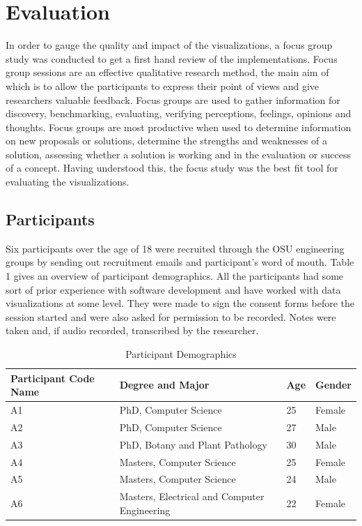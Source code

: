\documentclass[seploa]{beavtex}
\begin{document}
\chapter{Evaluation}
In order to gauge the quality and impact of the visualizations, a focus group study was conducted to get a first hand review of the implementations. Focus group sessions are an effective qualitative research method, the main aim of which is to allow the participants to express their point of views and give researchers valuable feedback\cite{villard}.  Focus groups are used to gather information for discovery, benchmarking, evaluating, verifying perceptions, feelings, opinions and thoughts\cite{patton1990}. Focus groups are most productive when used to determine information on new proposals or solutions, determine the strengths and weaknesses of a solution, assessing whether a solution is working and in the evaluation or success of a concept\cite{greenbaum1993}. Having understood this, the focus study was the best fit tool for evaluating the visualizations.

\section{Participants}
Six participants over the age of 18 were recruited through the OSU engineering groups by sending out recruitment emails and participant's word of mouth. Table 1 gives an overview of participant demographics. All the participants had some sort of prior experience with software development and have worked with data visualizations at some level. They were made to sign the consent forms before the session started and were also asked for permission to be recorded. Notes were taken and, if audio recorded, transcribed by the researcher.

\begin{table}
\centering
\begin{tabular}{ |p{3cm}||p{5cm}|p{3cm}|p{3cm}|  }
 \hline
Participant Code Name & Degree and Major & Age & Gender\\
 \hline
 A1 & PhD, Computer Science & 25 & Female\\
 A2 & PhD, Computer Science & 27 & Male\\
 A3 & PhD, Botany and Plant Pathology & 30 & Male\\
 A4 & Masters, Computer Science & 25 & Female\\
 A5 & Masters, Computer Science & 24 & Male\\
 A6 & Masters, Electrical and Computer Engineering & 22 & Female\\
 \hline
\end{tabular}
\caption{Participant Demographics}
\label{tab:table1}
\end{table}
\end{document}
